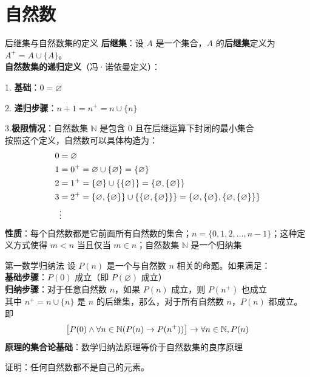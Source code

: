 \documentclass[lang=cn,11pt]{elegantbook}
\begin{document}
\section{自然数}
\begin{definition}{后继集与自然数集的定义}
\textbf{后继集}：设 $A$ 是一个集合，$A$ 的\textbf{后继集}定义为 $A^{+} = A \cup \{A\}$。\\
\textbf{自然数集的递归定义}（冯·诺依曼定义）：

1. \textbf{基础}：$0 = \varnothing$

2. \textbf{递归步骤}：$n + 1 = n^{+} = n \cup \{n\}$

3.\textbf{极限情况}：自然数集 $\mathbb{N}$ 是包含 $0$ 且在后继运算下封闭的最小集合\\
按照这个定义，自然数可以具体构造为：\vspace{-10pt}
\begin{align*}
0 &= \varnothing \\
1 &= 0^{+} = \varnothing \cup \{\varnothing\} = \{\varnothing\} \\
2 &= 1^{+} = \{\varnothing\} \cup \{\{\varnothing\}\} = \{\varnothing, \{\varnothing\}\} \\
3 &= 2^{+} = \{\varnothing, \{\varnothing\}\} \cup \{\{\varnothing, \{\varnothing\}\}\} = \{\varnothing, \{\varnothing\}, \{\varnothing, \{\varnothing\}\}\} \\
&\vdots
\vspace{-10pt}\end{align*}
\textbf{性质}：每个自然数都是它前面所有自然数的集合；$n = \{0, 1, 2, \ldots, n-1\}$；这种定义方式使得 $m < n$ 当且仅当 $m \in n$；自然数集 $\mathbb{N}$ 是一个归纳集
\end{definition}
\begin{definition}{第一数学归纳法}
    设 $P(n)$ 是一个与自然数 $n$ 相关的命题。如果满足：\\
    \textbf{基础步骤}：$P(0)$ 成立（即 $P(\varnothing)$ 成立）\\
    \textbf{归纳步骤}：对于任意自然数 $n$，如果 $P(n)$ 成立，则 $P(n^{+})$ 也成立\\
    其中 $n^{+} = n \cup \{n\}$ 是 $n$ 的后继集，那么，对于所有自然数 $n$，$P(n)$ 都成立。即\vspace{-10pt}
\[\bigl[P(0) \land \forall n \in \mathbb{N}(P(n) \rightarrow P(n^{+}))\bigr] \rightarrow \forall n \in \mathbb{N}, P(n)\vspace{-10pt}\]
\textbf{原理的集合论基础}：数学归纳法原理等价于自然数集的良序原理
\end{definition}
证明：任何自然数都不是自己的元素。
\end{document}
